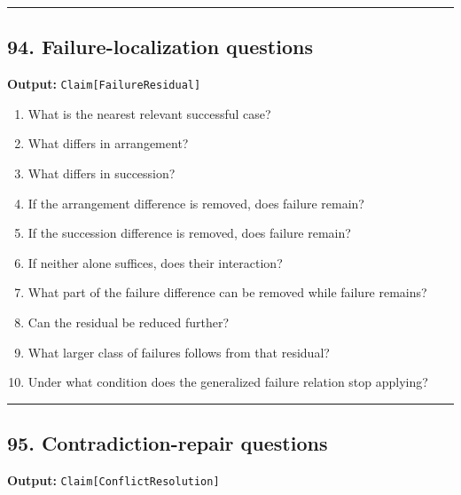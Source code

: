 \documentclass[
]{article}
\providecommand{\tightlist}{%
  \setlength{\itemsep}{0pt}\setlength{\parskip}{0pt}}
\begin{document}
\begin{center}\rule{0.5\linewidth}{0.5pt}\end{center}

\subsection{94. Failure-localization
questions}\label{failure-localization-questions}

\textbf{Output:} \texttt{Claim{[}FailureResidual{]}}

\begin{enumerate}
\def\labelenumi{\arabic{enumi}.}
\tightlist
\item
  What is the nearest relevant successful case?
\item
  What differs in arrangement?
\item
  What differs in succession?
\item
  If the arrangement difference is removed, does failure remain?
\item
  If the succession difference is removed, does failure remain?
\item
  If neither alone suffices, does their interaction?
\item
  What part of the failure difference can be removed while failure
  remains?
\item
  Can the residual be reduced further?
\item
  What larger class of failures follows from that residual?
\item
  Under what condition does the generalized failure relation stop
  applying?
\end{enumerate}

\begin{center}\rule{0.5\linewidth}{0.5pt}\end{center}

\subsection{95. Contradiction-repair
questions}\label{contradiction-repair-questions}

\textbf{Output:} \texttt{Claim{[}ConflictResolution{]}}
\end{document}
